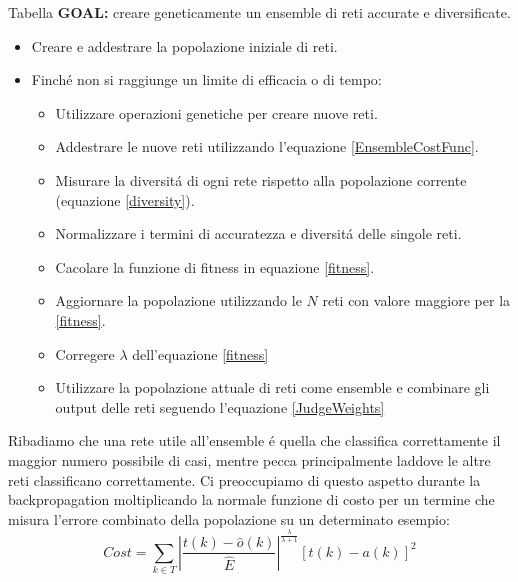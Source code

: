 \documentclass[a4paper,10pt]{article}
\begin{document}
  Tabella \textbf{GOAL:} creare geneticamente un ensemble di reti accurate e diversificate.
  \begin{itemize}
   \item Creare e addestrare la popolazione iniziale di reti.
   \item Finch\'e non si raggiunge un limite di efficacia o di tempo:
   \begin{itemize}
    \item Utilizzare operazioni genetiche per creare nuove reti.
    \item Addestrare le nuove reti utilizzando l'equazione \ref{EnsembleCostFunc}.
    \item Misurare la diversit\'a di ogni rete rispetto alla popolazione corrente (equazione \ref{diversity}).
    \item Normalizzare i termini di accuratezza e diversit\'a delle singole reti.
    \item Cacolare la funzione di fitness in equazione \ref{fitness}.
    \item Aggiornare la popolazione utilizzando le $N$ reti con valore maggiore per la \ref{fitness}.
    \item Corregere $\lambda$ dell'equazione \ref{fitness}
    \item Utilizzare la popolazione attuale di reti come ensemble e combinare gli output delle reti seguendo l'equazione \ref{JudgeWeights}
   \end{itemize}
  \end{itemize}
  Ribadiamo che una rete utile all'ensemble \'e quella che classifica correttamente il maggior numero possibile di casi, mentre pecca principalmente laddove le altre reti classificano correttamente. Ci preoccupiamo di questo aspetto durante la backpropagation moltiplicando la normale funzione di costo per un termine che misura l'errore combinato della popolazione su un determinato esempio:
  \begin{equation}
   Cost = \sum_{k \in T} \left| \frac{t \left(k\right) - \widehat{o} \left(k\right)}{\widehat{E}} \right|^{\frac{\lambda}{\lambda + 1}} \left[ t\left(k\right) - a\left(k\right) \right]^2 \label{EnsembleCostFunc}
  \end{equation}
\end{document}
